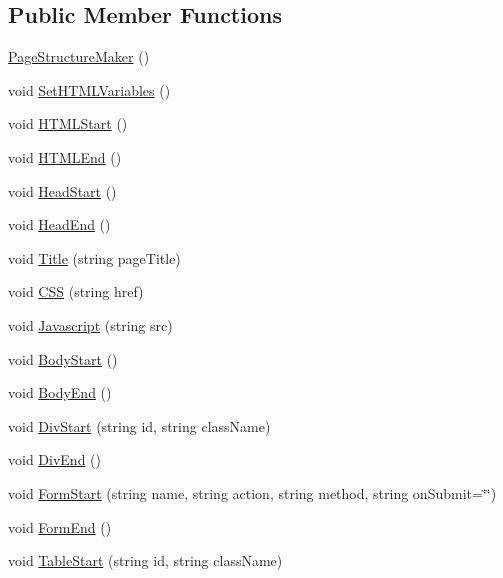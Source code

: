 \subsection*{\-Public \-Member \-Functions}
\begin{DoxyCompactItemize}
\item 
\hyperlink{classPageStructureMaker_a95e6305a2b5121840fb5b74297a040ce}{\-Page\-Structure\-Maker} ()
\item 
void \hyperlink{classPageStructureMaker_aaf78d67380c400cc0057c6519276f721}{\-Set\-H\-T\-M\-L\-Variables} ()
\item 
void \hyperlink{classPageStructureMaker_ad25d6abc983253567e2370882fc1b407}{\-H\-T\-M\-L\-Start} ()
\item 
void \hyperlink{classPageStructureMaker_a63b877af1c2c8de8332e3f7eb4c2c2b0}{\-H\-T\-M\-L\-End} ()
\item 
void \hyperlink{classPageStructureMaker_a14312134cb108f91f2e6d9cbd6916e97}{\-Head\-Start} ()
\item 
void \hyperlink{classPageStructureMaker_ad64115d592b0989b422a93f85278186e}{\-Head\-End} ()
\item 
void \hyperlink{classPageStructureMaker_a81e902ddc0c0287df1ba0f614a3774d6}{\-Title} (string page\-Title)
\item 
void \hyperlink{classPageStructureMaker_aacdb11817f8ab246bc59c552e04e862d}{\-C\-S\-S} (string href)
\item 
void \hyperlink{classPageStructureMaker_ac221d1169f4dbcef6adb00938919193d}{\-Javascript} (string src)
\item 
void \hyperlink{classPageStructureMaker_ab7a645675166f34fac99f1ed8feb7c27}{\-Body\-Start} ()
\item 
void \hyperlink{classPageStructureMaker_ac91e234e2d54dedd9d7e556fabf21d2b}{\-Body\-End} ()
\item 
void \hyperlink{classPageStructureMaker_a927f92889555dd316c129f706be86a5c}{\-Div\-Start} (string id, string class\-Name)
\item 
void \hyperlink{classPageStructureMaker_a2913e76bf188ed777dcd33003ef6207d}{\-Div\-End} ()
\item 
void \hyperlink{classPageStructureMaker_aa87c4296495fb0a175f40701deda7745}{\-Form\-Start} (string name, string action, string method, string on\-Submit=\char`\"{}\char`\"{})
\item 
void \hyperlink{classPageStructureMaker_a65d97f23bb543f3db5201b2009f7f65a}{\-Form\-End} ()
\item 
void \hyperlink{classPageStructureMaker_a04e68e69005f3933e0f496c3db474daf}{\-Table\-Start} (string id, string class\-Name)

\end{DoxyCompactItemize}
